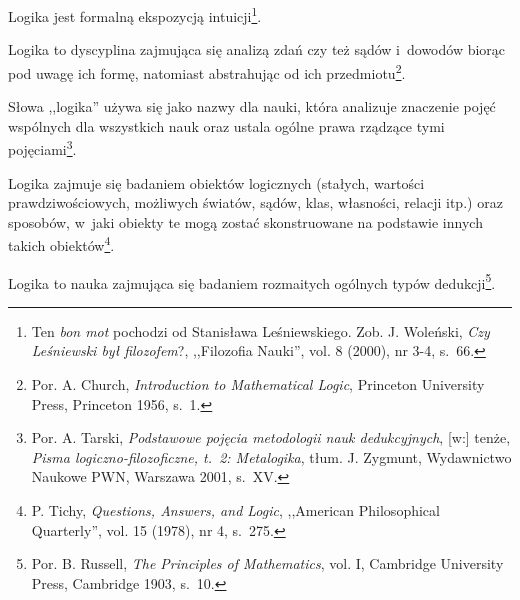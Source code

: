 \begin{defin}
Logika jest formalną ekspozycją intuicji\footnote{Ten \textit{bon mot} pochodzi od Stanisława Leśniewskiego. Zob. J. Woleński, \textit{Czy Leśniewski był filozofem}?, ,,Filozofia Nauki'', vol. 8 (2000), nr 3-4, s.~66.}.
\end{defin}
\begin{defin}
Logika to dyscyplina zajmująca się analizą zdań czy też sądów i~dowodów biorąc pod uwagę ich formę, natomiast abstrahując od ich przedmiotu\footnote{Por. A. Church, \textit{Introduction to Mathematical Logic}, Princeton University Press,
Princeton
1956, s.~1.}.
\end{defin}
\begin{defin}
Słowa ,,logika'' używa się jako nazwy dla nauki, która analizuje znaczenie pojęć wspólnych dla wszystkich nauk oraz ustala ogólne prawa rządzące tymi pojęciami\footnote{Por. A. Tarski, \textit{Podstawowe pojęcia metodologii nauk dedukcyjnych}, [w:] tenże, \textit{Pisma logiczno-filozoficzne, t.~2: Metalogika}, tłum. J. Zygmunt, Wydawnictwo Naukowe PWN, Warszawa 2001, s.~XV.}.
\end{defin}
\begin{defin}
Logika zajmuje się badaniem obiektów logicznych (stałych, wartości prawdziwościowych, możliwych światów, sądów, klas, własności, relacji itp.) oraz sposobów, w~jaki obiekty te mogą zostać skonstruowane na podstawie innych takich obiektów\footnote{P. Tichy, \textit{Questions, Answers, and Logic}, ,,American Philosophical Quarterly'', vol. 15 (1978), nr 4, s.~275.}.
\end{defin}
\begin{defin}
Logika to nauka zajmująca się badaniem rozmaitych ogólnych typów dedukcji\footnote{Por. B. Russell, \textit{The Principles of Mathematics}, vol. I, Cambridge University Press, Cambridge 1903, s.~10.}.
\end{defin}


